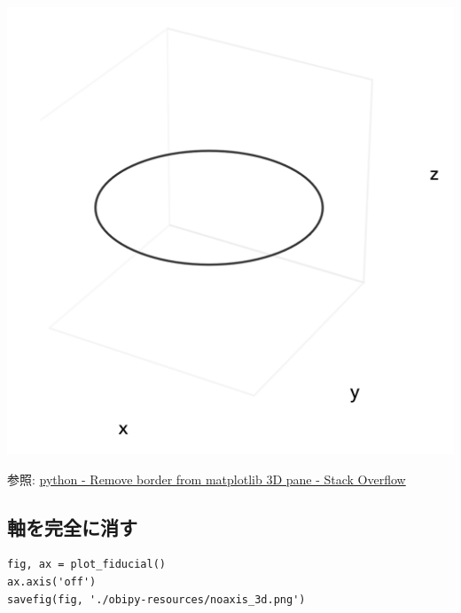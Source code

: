 \documentclass[a4paper, 10pt, notitlepage, twocolumn, uplatex, oneside, dvipdfmx]{jsarticle}
\begin{document}
\label{}
\begin{center}
\includegraphics[width=1.0\linewidth]{./obipy-resources/axis_3d.png}
\end{center}

参照: \href{https://stackoverflow.com/questions/59857203/remove-border-from-matplotlib-3d-pane}{python - Remove border from matplotlib 3D pane - Stack Overflow}
\subsection{軸を完全に消す}
\label{sec:org29a5541}
\begin{verbatim}
fig, ax = plot_fiducial()
ax.axis('off')
savefig(fig, './obipy-resources/noaxis_3d.png')
\end{verbatim}
\end{document}
